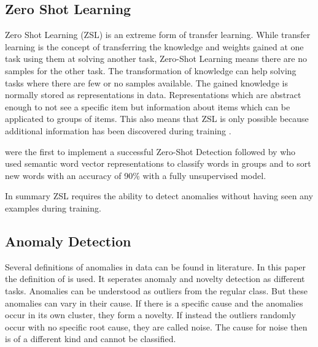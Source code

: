 \subsection{Zero Shot Learning}
Zero Shot Learning (ZSL) is an extreme form of transfer learning. While transfer learning is the concept of transferring the knowledge and weights gained at one task using them at solving another task, Zero-Shot Learning means there are no samples for the other task. The transformation of knowledge can help solving tasks where there are few or no samples available. The gained knowledge is normally stored as representations in data. Representations which are abstract enough to not see a specific item but information about items which can be applicated to groups of items. This also means that ZSL is only possible because additional information has been discovered during training .

 were the first to implement a successful Zero-Shot Detection followed by  who used semantic word vector representations to classify words in groups and to sort new words with an accuracy of 90\% with a fully unsupervised model.

In summary ZSL requires the ability to detect anomalies without having seen any examples during training.
\subsection{Anomaly Detection}
Several definitions of anomalies in data can be found in literature. In this paper the definition of  is used. It seperates anomaly and novelty detection as different tasks. Anomalies can be understood as outliers from the regular class. But these anomalies can vary in their cause. If there is a specific cause and the anomalies occur in its own cluster, they form a novelty. If instead the outliers randomly occur with no specific root cause, they are called noise. The cause for noise then is of a different kind and cannot be classified.

